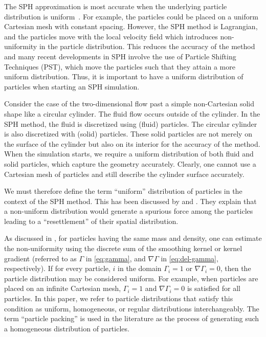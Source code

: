 \documentclass[preprint,12pt]{elsarticle}
\begin{document}
The SPH approximation is most accurate when the underlying particle
distribution is
uniform~\cite{sph:basa-etal-2009,kiara_sph_2013,amicarelli_sph_2011}. For
example, the particles could be placed on a uniform Cartesian mesh with
constant spacing. However, the SPH method is Lagrangian, and the particles
move with the local velocity field which introduces non-uniformity in the
particle distribution. This reduces the accuracy of the method and many recent
developments in SPH involve the use of Particle Shifting Techniques
(PST)\cite{diff_smoothing_sph:lind:jcp:2009,xu2009accuracy,Adami2013}, which
move the particles such that they attain a more uniform distribution. Thus, it
is important to have a uniform distribution of particles when starting an SPH
simulation.

Consider the case of the two-dimensional flow past a simple non-Cartesian
solid shape like a circular cylinder. The fluid flow occurs outside of the
cylinder. In the SPH method, the fluid is discretized using (fluid) particles.
The circular cylinder is also discretized with (solid) particles. These solid
particles are not merely on the surface of the cylinder but also on its
interior for the accuracy of the method. When the simulation starts, we
require a uniform distribution of both fluid and solid particles, which
capture the geometry accurately. Clearly, one cannot use a Cartesian mesh of
particles and still describe the cylinder surface accurately.

We must therefore define the term ``uniform'' distribution of particles in
the context of the SPH method. This has been discussed by
\citet{colagrossi2012particle} and \citet{litvinov_towards_2015}. They
explain that a non-uniform distribution would generate a spurious force among
the particles leading to a ``resettlement'' of their spatial distribution.

As discussed in \cite{colagrossi2012particle}, for particles having the same
mass and density, one can estimate the non-uniformity using the discrete sum
of the smoothing kernel or kernel gradient (referred to as $\Gamma$ in
\cref{eq:gamma}, and $\nabla \Gamma$ in \cref{eq:del-gamma}, respectively).
If for every particle, $i$ in the domain $\Gamma_i=1$ or $\nabla \Gamma_i=0$,
then the particle distribution may be considered uniform. For example, when
particles are placed on an infinite Cartesian mesh, $\Gamma_i=1$ and $\nabla
\Gamma_i=0$ is satisfied for all particles. In this paper, we refer to
particle distributions that satisfy this condition as uniform, homogeneous,
or regular distributions interchangeably. The term ``particle packing'' is
used in the literature as the process of generating such a homogeneous
distribution of particles.
\end{document}
